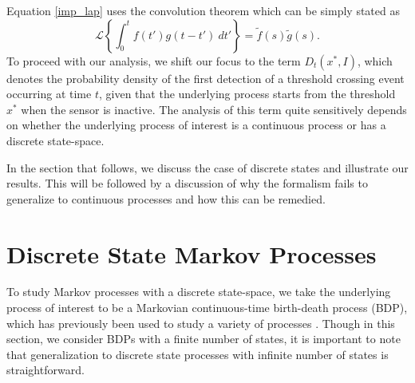 Equation \eqref{imp_lap} uses the convolution theorem \cite{klafter2011first} which can be simply stated as
\begin{equation}
    \mathcal{L}\left\{  \int_0^t f(t') g(t-t') ~dt'\right\}  = \widetilde{f}(s) \widetilde{g}(s). 
\end{equation}
To proceed with our analysis, we shift our focus to the term $D_t(x^*,I)$, which denotes the probability density of the first detection of a threshold crossing event occurring at time $t$, given that the underlying process starts from the threshold $x^*$ when the sensor is inactive. The analysis of this term quite sensitively depends on whether the underlying process of interest is a continuous process or has a discrete state-space. 

In the section that follows, we discuss the case of discrete states and illustrate our results. This will be followed by a discussion of why the formalism fails to generalize to continuous processes and how this can be remedied. 


\section{Discrete State Markov Processes}

To study Markov processes with a discrete state-space, we take the underlying process of interest to be a Markovian continuous-time birth-death process (BDP), which has previously been used to study a variety of processes \cite{azaele_statistical_2016,novozhilov_biological_2006,crawford_transition_2012,freidenfelds_capacity_1980,math7060489,ho_birthbirth-death_2018,pre_assaf_2020,prl_assaf_2020,sanders_how_2008,di_lauro_network_2020,kiss_mathematics_2017,nagy_approximate_2014}. Though in this section, we consider BDPs with a finite number of states, it is important to note that generalization to discrete state processes with infinite number of states is straightforward. 

